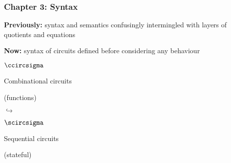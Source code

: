 \begin{frame}
    \frametitle{Chapter 3: Syntax}

    \pause

    \textbf{Previously:} syntax and semantics confusingly intermingled with
    layers of quotients and equations

    \pause

    \textbf{Now:} syntax of circuits defined before considering any behaviour

    \pause

    \vspace{1em}

    \begin{center}
        \begin{minipage}{0.4\textwidth}
            \centering
            {\LARGE\(\ccircsigma\)}

            \vspace{1em}

            \alert{Combinational} circuits

            (functions)
        \end{minipage}
        \pause
        {\LARGE\(\hookrightarrow\)}
        \begin{minipage}{0.4\textwidth}
            \centering
            {\LARGE\(\scircsigma\)}

            \vspace{1em}

            \alert{Sequential} circuits

            (stateful)
        \end{minipage}
    \end{center}

\end{frame}

